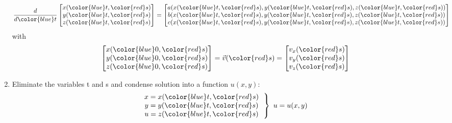 \documentclass[10pt,landscape]{article}
\begin{document}
\begin{multicols}{3}
\begin{enumerate}
{		\begin{align*}
			\frac{d}{d{\color{blue}t}}
			\begin{bmatrix}
				x({\color{blue}t}, {\color{red}s}) \\
				y({\color{blue}t}, {\color{red}s}) \\
				z({\color{blue}t}, {\color{red}s})
			\end{bmatrix}
			=
			\begin{bmatrix}
				a(x({\color{blue}t},{\color{red}s}), y({\color{blue}t},{\color{red}s}), z({\color{blue}t}, {\color{red}s})) \\
				b(x({\color{blue}t},{\color{red}s}), y({\color{blue}t},{\color{red}s}), z({\color{blue}t}, {\color{red}s})) \\
				c(x({\color{blue}t},{\color{red}s}), y({\color{blue}t},{\color{red}s}), z({\color{blue}t}, {\color{red}s}))
			\end{bmatrix}
		\end{align*}
		with
		\begin{align*}
			\begin{bmatrix}
				x({\color{blue}0}, {\color{red}s}) \\
				y({\color{blue}0}, {\color{red}s}) \\
				z({\color{blue}0}, {\color{red}s})
			\end{bmatrix}
			=
			\vec{v}({\color{red}s})
			=
			\begin{bmatrix}
				v_x({\color{red}s} ) \\
				v_y({\color{red}s}) \\
				v_z({\color{red}s})
			\end{bmatrix}
		\end{align*}
	}
	\item{
		Eliminate the variables {\color{blue}t} and {\color{red}s} and condense solution into a function $u(x, y)$:
		\begin{align*}
			\left.
			\begin{matrix}
				x=x({\color{blue}t},{\color{red}s}) \\
				y=y({\color{blue}t},{\color{red}s}) \\
				u=z({\color{blue}t},{\color{red}s})
			\end{matrix}
			\ \ \right\}
			\ u=u(x,y)
		\end{align*}
	}
\end{enumerate}



\newpage



\end{multicols}
\end{document}
